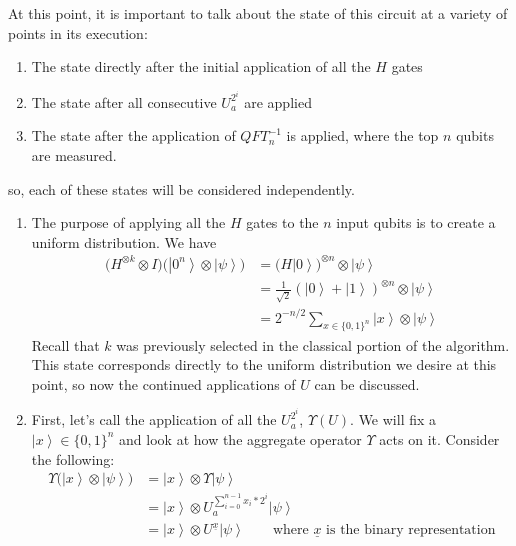 \documentclass{exam} %
\theoremstyle{plain}
\theoremstyle{definition}
\theoremstyle{remark}
\numberwithin{equation}{section}  %
\newcommand{\ket}[1]{ \left| #1 \right> }
\begin{document}
\begin{enumerate}
      At this point, it is important to talk about the state of this circuit
      at a variety of points in its execution:
      \begin{enumerate}
        \item The state directly after the initial application of all the $H$
          gates
        \item The state after all consecutive $U_a^{2^i}$ are applied
        \item The state after the application of $QFT_n^{-1}$ is applied,
          where the top $n$ qubits are measured. 
      \end{enumerate}
      so, each of these states will be considered independently.
      \begin{enumerate}
        \item The purpose of applying all the $H$ gates to the $n$ input
          qubits is to create a uniform distribution. We have
          \begin{align*}
            \big(H^{\otimes k} \otimes I\big)
            \big(\ket{0^n}\otimes\ket{\psi}\big)
            &=
            \big(H\ket{0}\big)^{\otimes n} \otimes \ket{\psi}\\
            &=
            \frac{1}{\sqrt{2}} (\ket{0} + \ket{1})^{\otimes n} 
            \otimes \ket{\psi}\\
            &=
            2^{-n/2} \sum_{x\in\{0,1\}^n} \ket{x} \otimes \ket{\psi}
          \end{align*}
          Recall that $k$ was previously selected in the classical portion of the
          algorithm. This state corresponds directly to the uniform 
          distribution we desire
          at this point, so now the continued applications of $U$ can be 
          discussed.\\
        \item
          First, let's call the application of all the $U_a^{2^i}$, 
          $\Upsilon(U)$.
          We will fix a $\ket{x} \in \{0,1\}^n$ and look at how the 
          aggregate operator $\Upsilon$ acts on it. Consider the following:
          \begin{align*}
            \Upsilon \big(\ket{x} \otimes \ket{\psi}\big)
            &= \ket{x} \otimes \Upsilon \ket{\psi}\\
            &= \ket{x} \otimes U_a^{\sum_{i=0}^{n-1} x_i*2^i}\ket{\psi}\\
            &= \ket{x} \otimes U^{\underline{x}}\ket{\psi}\qquad 
            \text{where }\underline{x}\text{ is the binary representation
}
\end{align*}
\end{enumerate}
\end{enumerate}
\end{document}
